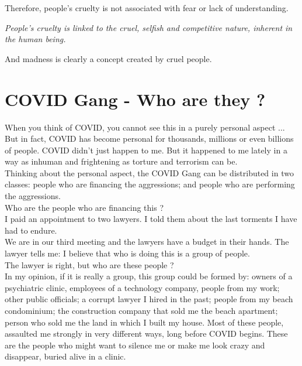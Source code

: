 \documentclass[11pt]{book}
\begin{document}
\noindent Therefore, people's cruelty is not associated with fear or lack of understanding.

\noindent \begin{center} \emph{People's cruelty is linked to the cruel, selfish and competitive nature, inherent in the human being.} \end{center}

\noindent And madness is clearly a concept created by cruel people.

\chapter {COVID Gang - Who are they ?}

\noindent When you think of COVID, you cannot see this in a purely personal aspect ... But in fact, COVID has become personal for thousands, millions or even billions of people. COVID didn't just happen to me. But it happened to me lately in a way as inhuman and frightening as torture and terrorism can be. \\

\noindent Thinking about the personal aspect, the COVID Gang can be distributed in two classes: people who are financing the aggressions; and people who are performing the aggressions. \\

\noindent Who are the people who are financing this ? \\

\noindent I paid an appointment to two lawyers. I told them about the last torments I have had to endure. \\

\noindent We are in our third meeting and the lawyers have a budget in their hands. The lawyer tells me: I believe that who is doing this is a group of people. \\

\noindent The lawyer is right, but who are these people ? \\

\noindent In my opinion, if it is really a group, this group could be formed by: owners of a psychiatric clinic, employees of a technology company, people from my work; other public officials; a corrupt lawyer I hired in the past; people from my beach condominium; the construction company that sold me the beach apartment; person who sold me the land in which I built my house. Most of these people, assaulted me strongly in very different ways, long before COVID begins. These are the people who might want to silence me or make me look crazy and disappear, buried alive in a clinic.\\
\end{document}
